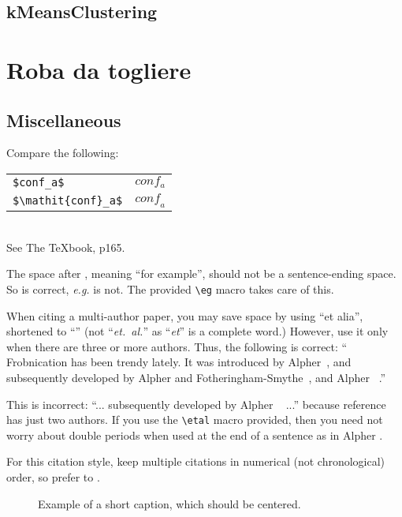 \documentclass[10pt,twocolumn,letterpaper]{article}
\begin{document}
\subsection{kMeansClustering}

\section{Roba da togliere}

\subsection{Miscellaneous}

\noindent
Compare the following:\\
\begin{tabular}{ll}
 \verb'$conf_a$' &  $conf_a$ \\
 \verb'$\mathit{conf}_a$' & $\mathit{conf}_a$
\end{tabular}\\
See The \TeX book, p165.

The space after \eg, meaning ``for example'', should not be a
sentence-ending space. So \eg is correct, {\em e.g.} is not.  The provided
\verb'\eg' macro takes care of this.

When citing a multi-author paper, you may save space by using ``et alia'',
shortened to ``\etal'' (not ``{\em et.\ al.}'' as ``{\em et}'' is a complete word.)
However, use it only when there are three or more authors.  Thus, the
following is correct: ``
   Frobnication has been trendy lately.
   It was introduced by Alpher~\cite{Alpher02}, and subsequently developed by
   Alpher and Fotheringham-Smythe~\cite{Alpher03}, and Alpher \etal~\cite{Alpher04}.''

This is incorrect: ``... subsequently developed by Alpher \etal~\cite{Alpher03} ...''
because reference~\cite{Alpher03} has just two authors.  If you use the
\verb'\etal' macro provided, then you need not worry about double periods
when used at the end of a sentence as in Alpher \etal.

For this citation style, keep multiple citations in numerical (not
chronological) order, so prefer \cite{Alpher03,Alpher02,Authors06} to
\cite{Alpher02,Alpher03,Authors06}.


\begin{figure*}
\begin{center}
\fbox{\rule{0pt}{2in} \rule{.9\linewidth}{0pt}}
\end{center}
   \caption{Example of a short caption, which should be centered.}
\label{fig:short}
\end{figure*}
\end{document}
